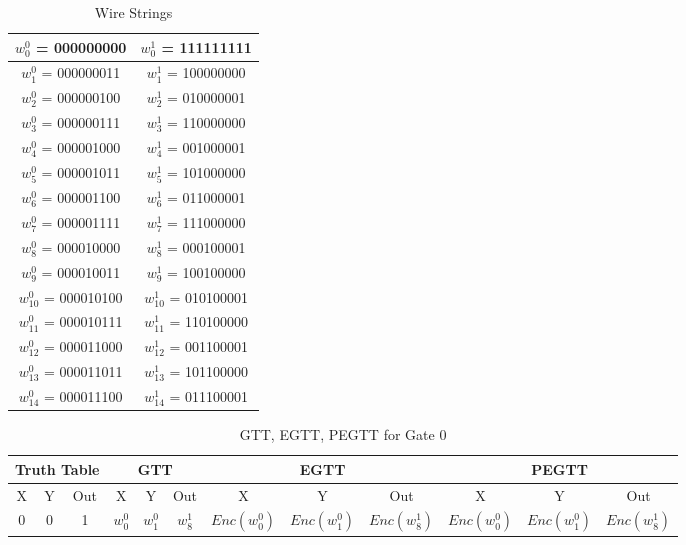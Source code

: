 \documentclass[times]{article}
\begin{document}
	\begin{table}
		\centering
		\caption{Wire Strings}
		\label{tab:wire}
		\begin{tabular}{| c | c |}
			\hline
			$w_0^0$ = 000000000 & $w_0^1$ = 111111111 \\
			\hline
			$w_1^0$ = 000000011 & $w_1^1$ = 100000000 \\
			\hline
			$w_2^0$ = 000000100 & $w_2^1$ = 010000001 \\
			\hline
			$w_3^0$ = 000000111 & $w_3^1$ = 110000000 \\
			\hline
			$w_4^0$ = 000001000 & $w_4^1$ = 001000001 \\
			\hline
			$w_5^0$ = 000001011 & $w_5^1$ = 101000000 \\
			\hline
			$w_6^0$ = 000001100 & $w_6^1$ = 011000001 \\
			\hline
			$w_7^0$ = 000001111 & $w_7^1$ = 111000000 \\
			\hline
			$w_8^0$ = 000010000 & $w_8^1$ = 000100001 \\
			\hline
			$w_9^0$ = 000010011 & $w_9^1$ = 100100000 \\
			\hline
			$w_{10}^0$ = 000010100 & $w_{10}^1$ = 010100001 \\
			\hline
			$w_{11}^0$ = 000010111 & $w_{11}^1$ = 110100000 \\
			\hline
			$w_{12}^0$ = 000011000 & $w_{12}^1$ = 001100001 \\
			\hline
			$w_{13}^0$ = 000011011 & $w_{13}^1$ = 101100000 \\
			\hline
			$w_{14}^0$ = 000011100 & $w_{14}^1$ = 011100001 \\
			\hline
		\end{tabular}
	\end{table}


	\begin{table}
		\centering
		\caption{GTT, EGTT, PEGTT for Gate 0}
		\label{tab:gtt0}
		\begin{adjustbox}{width=1\textwidth}
		\begin{tabular}{|c|c|c||c|c|c||c|c|c||c|c|c|}
			\hline
			\multicolumn{3}{|c||}{Truth Table} 		& 
				\multicolumn{3}{|c||}{GTT}			& 
					\multicolumn{3}{|c||}{EGTT} 		& 
						\multicolumn{3}{|c|}{PEGTT} \\
			\hline
			\hline
			X & Y & Out	& 
				X & Y & Out	& 
					X & Y & Out	& 
						X & Y & Out	\\
			\hline
			0 & 0 & 1 	&
				$w_{0}^0$	& $w_{1}^0$	& $w_{8}^1$	& 
					$Enc(w_{0}^0)$	& $Enc(w_{1}^0)$	& $Enc(w_{8}^1)$ &
						$Enc(w_{0}^0)$	& $Enc(w_{1}^0)$	& $Enc(w_{8}^1)$ \\
			\hline
		\end{tabular}
		\end{adjustbox}
	\end{table}
	
	
		
\end{document}
